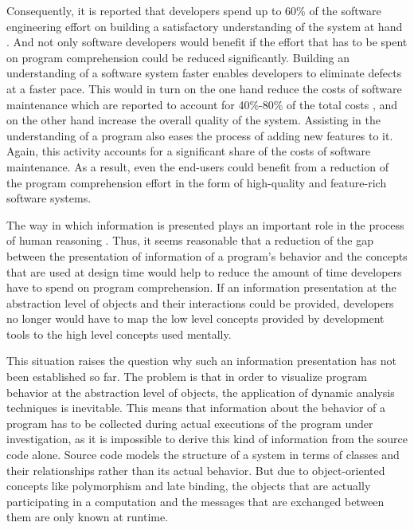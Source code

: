 Consequently, it is reported that developers spend up to 60\% of the software engineering effort on building a satisfactory understanding of the system at hand \cite{corbi_program_1989, basili_evolving_1997, ducasse_class_2005, rothlisberger_feature_2007, cornelissen_execution_2008}.
And not only software developers would benefit if the effort that has to be spent on program comprehension could be reduced significantly.
Building an understanding of a software system faster enables developers to eliminate defects at a faster pace.
This would in turn on the one hand reduce the costs of software maintenance which are reported to account for 40\%-80\% of the total costs \cite{glass_frequently_2001}, and on the other hand increase the overall quality of the system.
Assisting in the understanding of a program also eases the process of adding new features to it.
Again, this activity accounts for a significant share of the costs of software maintenance.
As a result, even the end-users could benefit from a reduction of the program comprehension effort in the form of high-quality and feature-rich software systems.

The way in which information is presented plays an important role in the process of human reasoning \cite{diehl_software_2007}.
Thus, it seems reasonable that a reduction of the gap between the presentation of information of a program's behavior and the concepts that are used at design time would help to reduce the amount of time developers have to spend on program comprehension.
If an information presentation at the abstraction level of objects and their interactions could be provided, developers no longer would have to map the low level concepts provided by development tools to the high level concepts used mentally.

This situation raises the question why such an information presentation has not been established so far.
The problem is that in order to visualize program behavior at the abstraction level of objects, the application of dynamic analysis techniques is inevitable.
This means that information about the behavior of a program has to be collected during actual executions of the program under investigation, as it is impossible to derive this kind of information from the source code alone.
Source code models the structure of a system in terms of classes and their relationships rather than its actual behavior.
But due to object-oriented concepts like polymorphism and late binding, the objects that are actually participating in a computation and the messages that are exchanged between them are only known at runtime.

